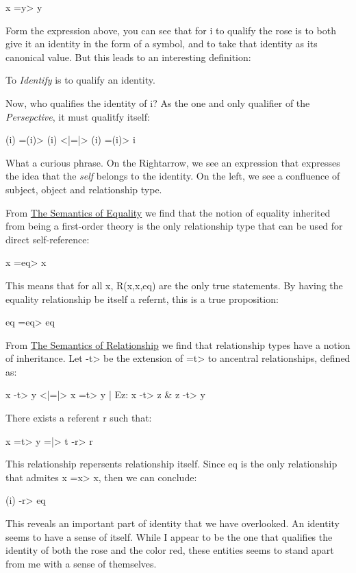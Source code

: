 \documentclass[runningheads]{llncs}
\begin{document}
x =y> y

Form the expression above, you can see that for i to qualify the rose is to both give it an identity in the form of a symbol, and to take that identity as its canonical value. But this leads to an interesting definition:

\setcounter{definition}{1}
\begin{sdefinition}
	To \emph{Identify} is to qualify an identity.
\end{sdefinition}

Now, who qualifies the identity of i? As the one and only qualifier of the \emph{Persepctive}, it must qualitfy itself:

(i) =(i)> (i) <|=|> (i) =(i)> i

What a curious phrase. On the Rightarrow, we see an expression that expresses the idea that the \emph{self} belongs to the identity. On the left, we see a confluence of subject, object and relationship type. 


From \href{https://github.com/DNA-Platform/inexplicable-phenomena/formalism/semantic-reference-theory/equality.pdf}{The Semantics of Equality} we find that the notion of equality inherited from being a first-order theory is the only relationship type that can be used for direct self-reference:

x =eq> x

This means that for all x, R(x,x,eq) are the only true statements. By having the equality relationship be itself a refernt, this is a true proposition:

eq =eq> eq

From \href{https://github.com/DNA-Platform/inexplicable-phenomena/formalism/semantic-reference-theory/relationship.pdf}{The Semantics of Relationship} we find that relationship types have a notion of inheritance. Let -t> be the extension of =t> to ancentral relationships, defined as:

x -t> y <|=|> x =t> y | Ez: x -t> z \& z -t> y

There exists a referent r such that:

x =t> y =|> t -r> r

This relationship repersents relationship itself. Since eq is the only relationship that admites x =x> x, then we can conclude:

(i) -r> eq

This reveals an important part of identity that we have overlooked. An identity seems to have a sense of itself. While I appear to be the one that qualifies the identity of both the rose and the color red, these entities seems to stand apart from me with a sense of themselves. 
\end{document}
